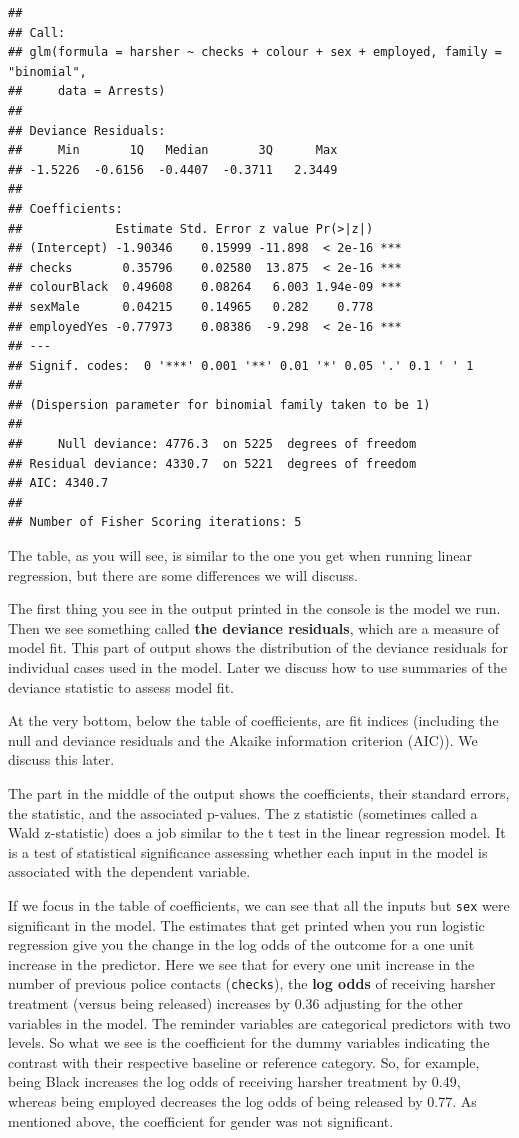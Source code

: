 \documentclass[]{book}
\theoremstyle{definition}
\theoremstyle{definition}
\theoremstyle{definition}
\theoremstyle{remark}
\begin{document}
\begin{verbatim}
## 
## Call:
## glm(formula = harsher ~ checks + colour + sex + employed, family = "binomial", 
##     data = Arrests)
## 
## Deviance Residuals: 
##     Min       1Q   Median       3Q      Max  
## -1.5226  -0.6156  -0.4407  -0.3711   2.3449  
## 
## Coefficients:
##             Estimate Std. Error z value Pr(>|z|)    
## (Intercept) -1.90346    0.15999 -11.898  < 2e-16 ***
## checks       0.35796    0.02580  13.875  < 2e-16 ***
## colourBlack  0.49608    0.08264   6.003 1.94e-09 ***
## sexMale      0.04215    0.14965   0.282    0.778    
## employedYes -0.77973    0.08386  -9.298  < 2e-16 ***
## ---
## Signif. codes:  0 '***' 0.001 '**' 0.01 '*' 0.05 '.' 0.1 ' ' 1
## 
## (Dispersion parameter for binomial family taken to be 1)
## 
##     Null deviance: 4776.3  on 5225  degrees of freedom
## Residual deviance: 4330.7  on 5221  degrees of freedom
## AIC: 4340.7
## 
## Number of Fisher Scoring iterations: 5
\end{verbatim}

The table, as you will see, is similar to the one you get when running
linear regression, but there are some differences we will discuss.

The first thing you see in the output printed in the console is the
model we run. Then we see something called \textbf{the deviance
residuals}, which are a measure of model fit. This part of output shows
the distribution of the deviance residuals for individual cases used in
the model. Later we discuss how to use summaries of the deviance
statistic to assess model fit.

At the very bottom, below the table of coefficients, are fit indices
(including the null and deviance residuals and the Akaike information
criterion (AIC)). We discuss this later.

The part in the middle of the output shows the coefficients, their
standard errors, the statistic, and the associated p-values. The z
statistic (sometimes called a Wald z-statistic) does a job similar to
the t test in the linear regression model. It is a test of statistical
significance assessing whether each input in the model is associated
with the dependent variable.

If we focus in the table of coefficients, we can see that all the inputs
but \texttt{sex} were significant in the model. The estimates that get
printed when you run logistic regression give you the change in the log
odds of the outcome for a one unit increase in the predictor. Here we
see that for every one unit increase in the number of previous police
contacts (\texttt{checks}), the \textbf{log odds} of receiving harsher
treatment (versus being released) increases by 0.36 adjusting for the
other variables in the model. The reminder variables are categorical
predictors with two levels. So what we see is the coefficient for the
dummy variables indicating the contrast with their respective baseline
or reference category. So, for example, being Black increases the log
odds of receiving harsher treatment by 0.49, whereas being employed
decreases the log odds of being released by 0.77. As mentioned above,
the coefficient for gender was not significant.
\end{document}
